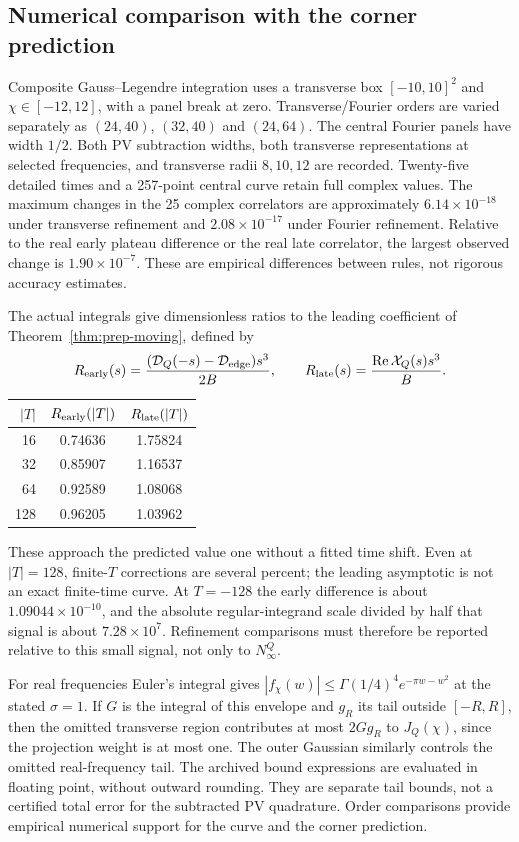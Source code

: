 \subsection{Numerical comparison with the corner prediction}
Composite Gauss--Legendre integration uses a transverse box
$[-10,10]^2$ and $\chi\in[-12,12]$, with a panel break at zero.
Transverse/Fourier orders are varied separately as
$(24,40)$, $(32,40)$ and $(24,64)$. The central Fourier panels have
width $1/2$. Both PV subtraction widths, both transverse representations
at selected frequencies, and transverse radii $8,10,12$ are recorded.
Twenty-five detailed times and a 257-point central curve retain full
complex values.
The maximum changes in the 25 complex correlators are approximately
$6.14\times10^{-18}$ under transverse refinement and
$2.08\times10^{-17}$ under Fourier refinement. Relative to the real
early plateau difference or the real late correlator, the largest
observed change is $1.90\times10^{-7}$. These are empirical differences
between rules, not rigorous accuracy estimates.

The actual integrals give dimensionless ratios to the leading coefficient
of Theorem~\ref{thm:prep-moving}, defined by
\[
 R_{\rm early}(s)=\frac{(\mathcal D_Q(-s)-\mathcal D_{\rm edge})s^3}{2B},
 \qquad R_{\rm late}(s)=\frac{\operatorname{Re}\mathcal X_Q(s)s^3}{B}.
\]
\begin{center}
\begin{tabular}{rcc}
\toprule
$|T|$ & $R_{\rm early}(|T|)$ & $R_{\rm late}(|T|)$\\
\midrule
16 & 0.74636 & 1.75824\\
32 & 0.85907 & 1.16537\\
64 & 0.92589 & 1.08068\\
128 & 0.96205 & 1.03962\\
\bottomrule
\end{tabular}
\end{center}
These approach the predicted value one without a
fitted time shift. Even at $|T|=128$, finite-$T$ corrections are several
percent; the leading asymptotic is not an exact finite-time curve.
At $T=-128$ the early difference is about $1.09044\times10^{-10}$,
and the absolute regular-integrand scale divided by half that signal
is about $7.28\times10^7$. Refinement comparisons must therefore be
reported relative to this small signal, not only to $N_\infty^Q$.

For real frequencies Euler's integral gives
$|f_\chi(w)|\le\Gamma(1/4)^4e^{-\pi w-w^2}$ at the stated $\sigma=1$.
If $G$ is the integral of this envelope and $g_R$ its tail outside
$[-R,R]$, then the omitted transverse region contributes at most
$2Gg_R$ to $J_Q(\chi)$, since the projection weight is at most one.
The outer Gaussian similarly controls the omitted real-frequency tail.
The archived bound expressions are evaluated in floating point, without
outward rounding. They are separate tail bounds, not a certified total
error for the subtracted PV quadrature. Order comparisons provide
empirical numerical support for the curve and the corner prediction.

